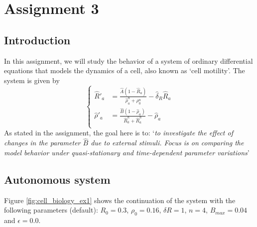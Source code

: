 \section{Assignment 3}

\subsection{Introduction}
In this assignment, we will study the behavior of a system of ordinary differential equations that models the dynamics of a cell, also known as `cell motility'. The system is given by
\begin{equation}
    \begin{cases}
        \hat{R}'_a &= \frac{\hat{A} \left(1 - \hat{R}_{a}\right)}{\hat{\rho}_a^{n} + \rho_{0}^{n}}  - \hat{\delta}_{R} \hat{R}_{a}\\
        \hat{\rho}'_a &= \frac{\hat{B} \left(1 - \hat{\rho}_a\right)}{\hat{R}_0^{n} + \hat{R}_{a}^{n}} - \hat{\rho}_a\\
    \end{cases}
\label{eq:cell_biology}
\end{equation}
As stated in the assignment, the goal here is to:
`\textit{to investigate the effect of changes in the parameter $\hat{B}$ due to external stimuli. Focus is on
comparing the model behavior under quasi-stationary and time-dependent parameter variations}'

\subsection{Autonomous system}
Figure \ref{fig:cell_biology_ex1} shows the continuation of the system with the following parameters (default): $R_0 = 0.3$, $\rho_0 = 0.16$, $\delta R = 1$, $n = 4$, $B_{max} = 0.04$ and $\epsilon = 0.0$. 

